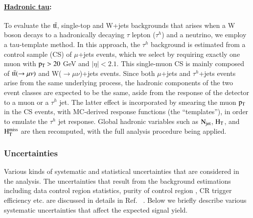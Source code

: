 \paragraph{\underline{Hadronic tau}: }

To evaluate the $\rm t\bar{t}$, single-top and W+jets backgrounds
that arises when a W boson decays to a hadronically decaying $\tau$ lepton ($\tau^{h}$) and a neutrino,
we employ a tau-template method. %
In this approach, the $\tau^{h}$ background is estimated from a control sample (CS)
of $\mu$+jets events,
which we select by requiring exactly one muon with $\rm p_{T}>20$ GeV and $|\eta|<2.1$. 
This single-muon CS is
mainly composed of $\rm t\bar{t}(\rightarrow \mu\nu)$ and W($\rightarrow \mu\nu$)+jets events.
Since both $\mu$+jets and $\tau^{h}$+jets events 
arise from the same underlying process,
the hadronic components of the two event classes are expected to be the same,
aside from the response of the 
detector to a muon or a $\tau^{h}$ jet. 
The latter effect is incorporated by smearing the muon $\rm p_{T}$ in the CS events,
with MC-derived response functions (the ``templates''),
in order to emulate the $\tau^{h}$ jet response.
Global hadronic variables such as $\rm N_{jet}$, $\rm H_{T}$, and $\rm H_{T}^{miss}$
are then recomputed, with the full analysis procedure being applied. 




\subsubsection{Uncertainties}

Various kinds of systematic and statistical uncertainties that are considered in the analysis. The uncertainties that result from the background estimations including data control region statistics, purity of control region , CR trigger efficiency etc. are discussed in details in Ref. ~\cite{CMS-PAS-SUS-15-002}. Below we briefly describe various systematic uncertainties that affect the expected signal yield.


